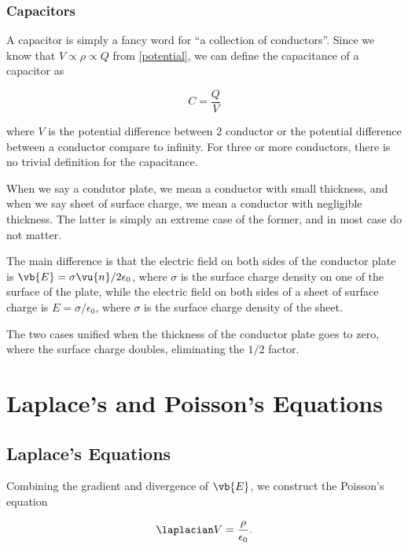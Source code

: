 \documentclass[english,a4paper,12pt]{report}
\begin{document}
\subsection{Capacitors}

A capacitor is simply a fancy word for ``a collection of conductors''. Since we know that \(V \propto \rho \propto Q\) from \cref{potential}, we can define the capacitance of a capacitor as

\begin{equation}
    C = \frac{Q}{V} 	
\end{equation}

where \(V\) is the potential difference between 2 conductor or the potential difference between a conductor compare to infinity. For three or more conductors, there is no trivial definition for the capacitance.

When we say a condutor plate, we mean a conductor with small thickness, and when we say sheet of surface charge, we mean a conductor with negligible thickness. The latter is simply an extreme case of the former, and in most case do not matter. 

The main difference is that the electric field on both sides of the conductor plate is \(\vb{E} = \sigma \vu{n} /2\epsilon _0 \), where \(\sigma \) is the surface charge density on one of the surface of the plate, while the electric field on both sides of a sheet of surface charge is \(E = \sigma /\epsilon _{0}  \), where \(\sigma \) is the surface charge density of the sheet.   

The two cases unified when the thickness of the conductor plate goes to zero, where the surface charge doubles, eliminating the \(1 /2 \) factor.  

\chapter{Laplace's and Poisson's Equations}

\section{Laplace's Equations} \label{lapeq} 


Combining the gradient and divergence of \(\vb{E} \), we construct the Poisson's equation

\begin{equation}
    \laplacian V = \frac{\rho }{\epsilon _0}. 
\end{equation}
\end{document}
